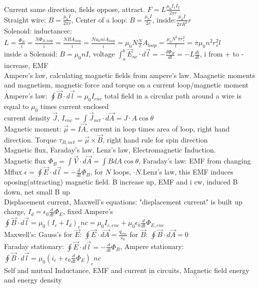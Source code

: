 \documentclass{article}
\begin{document}
\begin{large}
\\Current same direction, fields oppose, attract. $F=L\frac{\mu_0I_1I_2}{2\pi r}$
\\Straight wire: $B=\frac{\mu_0I}{2\pi r}$, Center of a loop: $B=\frac{\mu_0I}{2r}$, inside:$\frac{\mu_0I}{2\pi R^2}r$
\\Solenoid: inductancec: $L=\frac{\Phi_B}{i}=\frac{N\Phi_{B,loop}}{i}=\frac{NBA_{loop}}{i}=\frac{Nu_0niA_{loop}}{i}=\mu_0N\frac{N}{l}A_{loop}=\frac{\mu_0N^2\pi r_s^2}{l}=\pi\mu_0n^2r_s^2l$
\\inside a Solenoid: $B=\mu_0nI$, voltage $\int_a^b\vec E_{nc}\cdot d\vec l=-\frac{d\Phi_B}{dt}=-L\frac{di}{dt}$, i from + to - increase, EMF 
\\\indent Ampere's law, calculating magnetic fields from ampere's law. Maagnetic moments and magnetism, magnetic force and torque on a current loop/magnetic moment
\\Ampere's law: $\oint\vec B\cdot d\vec l=\mu_0I_{enc}$ total field in a circular path around a wire is equal to $\mu_0$ times current enclosed
\\current density $\vec J$, $I_{enc}=\int\vec J_{net}\cdot d\vec A=J\cdot A \cos\theta$
\\Magnetic moment: $\vec \mu=I\vec A$, current in loop times area of loop, right hand direction. Torque $\tau_{B,net}=\vec\mu\times\vec B$, right hand rule for spin direction
\\\indent Magnetic flux, Faraday's law, Lenz's law, Electromagnetic Induction.
\\Magnetic flux $\Phi_B=\int\vec V\cdot d\vec A=\int B dA\cos\theta$, Faraday's law: EMF from changing Mflux $\epsilon=\oint\vec E\cdot d\vec l=-\frac{d}{dt}\Phi_B$, for $N$ loops, $\cdot N$.\qquad Lenz's law, this EMF induces oposing(attracting) magnetic field. B increase up, EMF and i cw, induced B down, net small B up 
\\\indent Displacement current, Maxwell's equations:
"displacement current" is built up charge, $I_d=\epsilon_0\frac{d}{dt}\Phi_E$, fixed Ampere's $\oint\vec B\cdot d\vec l=\mu_0(I_c+I_d)_enc=\mu_0I_{c,enc}+\mu_0\epsilon_0\frac{d}{dt}\Phi_{E,enc}$
\\Maxwell's: Gauss's for $\vec E$: $\oint\vec E\cdot d\vec A=\frac{q_{enc}}{\epsilon_0}$ for $\vec B$: $\oint\vec B\cdot d\vec A=0$
\\Faraday stationary: $\oint\vec E\cdot d\vec l=-\frac{d}{dt}\Phi_B$, Ampere stationary: $\oint\vec B\cdot d\vec l=\mu_0(i_c+\epsilon_0\frac{d}{dt}\Phi_E)_enc$
\\\indent Self and mutual Inductance, EMF and current in circuits, Magnetic field energy and energy density

\end{large}
\end{document}
